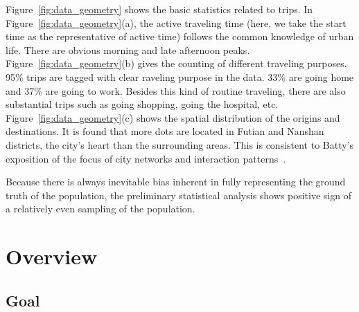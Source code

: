 Figure~\ref{fig:data_geometry} shows the basic statistics related to trips. In Figure~\ref{fig:data_geometry}(a), the active traveling time (here, we take the start time as the representative of active time) follows the common knowledge of urban life. There are obvious morning and late afternoon peaks. Figure~\ref{fig:data_geometry}(b) gives the counting of different traveling purposes. 95\% trips are tagged with clear raveling purpose in the data. 33\% are going home and 37\% are going to work. Besides this kind of routine traveling, there are also substantial trips such as going shopping, going the hospital, etc. Figure~\ref{fig:data_geometry}(c) shows the spatial distribution of the origins and destinations. It is found that more dots are located in Futian and Nanshan districts, the city's heart than the surrounding areas. This is consistent to Batty's exposition of the focus of city networks and interaction patterns~\citep{batty2013new}.



Because there is always inevitable bias inherent in fully representing the ground truth of the population, the preliminary statistical analysis shows positive sign of a relatively even sampling of the population.


\section{Overview}

\subsection{Goal}

\\
 


